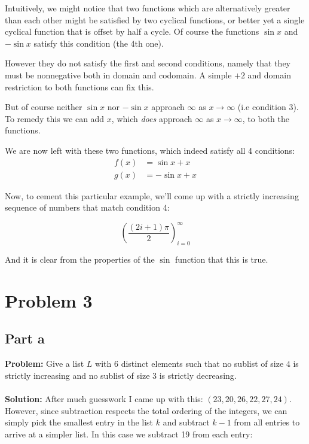 \documentclass{article}
\begin{document}
Intuitively, we might notice that two functions which are alternatively greater than each other might be satisfied by two cyclical functions, or better yet a single cyclical function that is offset by half a cycle. Of course the functions $\sin x$ and $-\sin x$ satisfy this condition (the 4th one).

\begin{center}
\end{center}

However they do not satisfy the first and second conditions, namely that they must be nonnegative both in domain and codomain. A simple $+2$ and domain restriction to both functions can fix this.

But of course neither $\sin x$ nor $-\sin x$ approach $\infty$ as $x\to\infty$ (i.e condition 3). To remedy this we can add $x$, which \textit{does} approach $\infty$ as $x\to\infty$, to both the functions.


We are now left with these two functions, which indeed satisfy all 4 conditions:
\begin{align}
f(x)&=\sin x+x\\
g(x)&=-\sin x+x
\end{align}

Now, to cement this particular example, we'll come up with a strictly increasing sequence of numbers that match condition 4:

$$\left(\frac{(2i+1)\pi}{2}\right)_{i=0}^\infty$$

And it is clear from the properties of the $\sin$ function that this is true.

\section{Problem 3}
\subsection{Part a}
\textbf{Problem:} Give a list $L$ with $6$ distinct elements such that no sublist of size $4$ is strictly increasing and no sublist of size $3$ is strictly decreasing.
\\\\
\textbf{Solution:} After much guesswork I came up with this: $(23,20,26,22,27,24)$. However, since subtraction respects the total ordering of the integers, we can simply pick the smallest entry in the list $k$ and subtract $k-1$ from all entries to arrive at a simpler list. In this case we subtract 19 from each entry:
\end{document}
